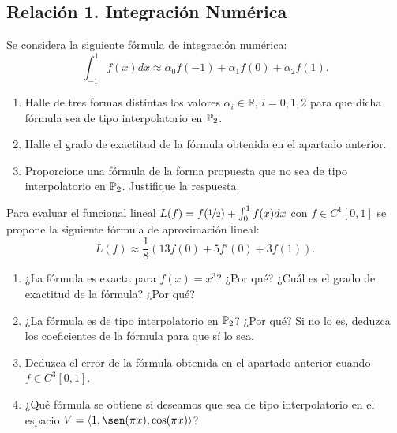 \subsection{Relación 1. Integración Numérica}
\setcounter{ejercicio}{8}

\begin{ejercicio}\label{ej:2.1.9}
    Se considera la siguiente fórmula de integración numérica:
    \begin{equation*}
        \int_{-1}^{1} f(x) dx \approx \alpha_0 f(-1) + \alpha_1 f(0) + \alpha_2 f(1).
    \end{equation*}
    \begin{enumerate}
        \item Halle de tres formas distintas los valores $\alpha_i \in \mathbb{R}$, $i = 0, 1, 2$ para que dicha fórmula sea de tipo interpolatorio en $\mathbb{P}_2$.
        \item Halle el grado de exactitud de la fórmula obtenida en el apartado anterior.
        \item Proporcione una fórmula de la forma propuesta que no sea de tipo interpolatorio en $\mathbb{P}_2$. Justifique la respuesta.
    \end{enumerate}
\end{ejercicio}

\begin{ejercicio}\label{ej:2.1.10}
    Para evaluar el funcional lineal $L(f) = f(\nicefrac{1}{2}) + \int_{0}^{1} f(x) dx$ con $f \in C^1[0, 1]$ se propone la siguiente fórmula de aproximación lineal:
    \begin{equation*}
        L(f) \approx \frac{1}{8} (13f(0) + 5f'(0) + 3f(1)).
    \end{equation*}
    \begin{enumerate}
        \item ¿La fórmula es exacta para $f(x) = x^3$? ¿Por qué? ¿Cuál es el grado de exactitud de la fórmula? ¿Por qué?
        \item ¿La fórmula es de tipo interpolatorio en $\mathbb{P}_2$? ¿Por qué? Si no lo es, deduzca los coeficientes de la fórmula para que sí lo sea.
        \item Deduzca el error de la fórmula obtenida en el apartado anterior cuando $f \in C^3[0, 1]$.
        \item ¿Qué fórmula se obtiene si deseamos que sea de tipo interpolatorio en el espacio $V = \langle 1, \sen(\pi x), \cos(\pi x)\rangle$?
    \end{enumerate}
\end{ejercicio}

